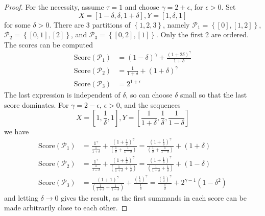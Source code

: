 \documentclass{article}
\theoremstyle{case}
\begin{document}
\begin{proof}
For the necessity, assume $\tau = 1$ and choose $\gamma = 2 + \epsilon$, for $\epsilon > 0$. Set
\[
X = \left[ 1-\delta, \delta, 1 + \delta\right], Y = \left[ 1, \delta, 1\right]
\] 
for some $\delta > 0$. There are 3 partitions of $\left\lbrace 1, 2, 3\right\rbrace$, namely $\mathcal{P}_1 = \left\lbrace \left[ 0 \right], \left[ 1, 2\right]\right\rbrace$, $\mathcal{P}_2 = \left\lbrace \left[ 0, 1 \right], \left[ 2\right]\right\rbrace$, and $\mathcal{P}_3 = \left\lbrace \left[ 0, 2 \right], \left[ 1 \right]\right\rbrace$. Only the first 2 are ordered. The scores can be computed
\begin{align*}
\text{Score}\left(\mathcal{P}_1\right) & = \left( 1-\delta \right)^\gamma + \frac{\left( 1+2\delta\right)^\gamma}{1+\delta} \\
\text{Score}\left(\mathcal{P}_2\right) & = \frac{1}{1+\delta} + \left( 1+\delta\right)^\gamma \\
\text{Score}\left(\mathcal{P}_3\right) & = 2^{1+\epsilon}
\end{align*}
The last expression is independent of $\delta$, so can choose $\delta$ small so that the last score dominates.
For $\gamma = 2 - \epsilon$, $\epsilon > 0$, and the sequences
\[
X = \left[ 1, \frac{1}{\delta}, 1\right], Y = \left[ \frac{1}{1+\delta}, \frac{1}{\delta}, \frac{1}{1-\delta}\right]
\] 
we have
\begin{align*}
\text{Score}\left(\mathcal{P}_1\right) & = \frac{1^\gamma}{\frac{1}{1+\delta}} + \frac{\left(1 + \frac{1}{\delta}\right)^\gamma}{\left( \frac{1}{\delta} + \frac{1}{1 - \delta}\right) }  = \frac{\left(1 + \frac{1}{\delta}\right)^\gamma}{\left( \frac{1}{\delta} + \frac{1}{1 - \delta}\right) } + \left( 1 + \delta \right)\\
\text{Score}\left(\mathcal{P}_2\right) & = \frac{1^\gamma}{\frac{1}{1-\delta}} + \frac{\left( 1 + \frac{1}{\delta}\right)^\gamma}{\left( \frac{1}{1+\delta} + \frac{1}{\delta}\right)}  = \frac{\left( 1 + \frac{1}{\delta}\right)^\gamma}{\left( \frac{1}{1+\delta} + \frac{1}{\delta}\right)} + \left( 1 - \delta \right)\\
\text{Score}\left(\mathcal{P}_3\right) & = \frac{\left( 1 + 1\right)^\gamma}{\left(\frac{1}{1+\delta} + \frac{1}{1-\delta}\right)}  + \frac{\left( \frac{1}{\delta}\right)^\gamma}{\frac{1}{\delta}} = \frac{\left( \frac{1}{\delta}\right)^\gamma}{\frac{1}{\delta}} + 2^{\gamma - 1}\left( 1 - \delta^2\right) 
\end{align*}
and letting $\delta \rightarrow 0$ gives the result, as the first summands in each score can be made arbitrarily close to each other.


\end{proof}
\end{document}
